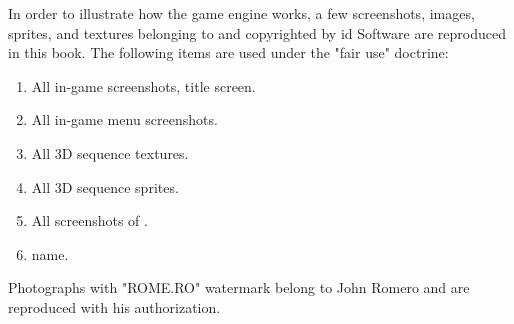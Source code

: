 In order to illustrate how the \doom{} game engine works, a few screenshots, images, sprites, and textures belonging to and copyrighted by id Software are reproduced in this book. The following items are used under the "fair use" doctrine:\\
\par
\begin{enumerate}
	\item All in-game screenshots, title screen.
	\item All in-game menu screenshots.
	\item All 3D sequence textures.
    \item All 3D sequence sprites.
    \item All screenshots of \doom.
    \item \doom{} name.
\end{enumerate}
\par
Photographs with "ROME.RO" watermark belong to John Romero and are reproduced with his authorization.
